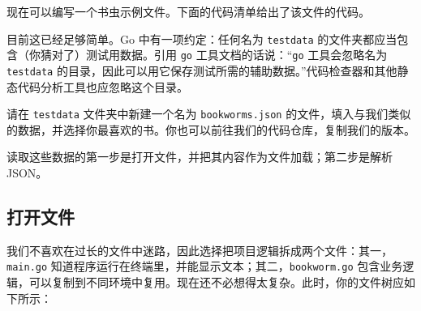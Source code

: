 现在可以编写一个书虫示例文件。下面的代码清单给出了该文件的代码。

\begin{gocode}
\end{gocode}

目前这已经足够简单。Go 中有一项约定：任何名为 \texttt{testdata} 的文件夹都应当包含（你猜对了）测试用数据。引用 \texttt{go} 工具文档的话说：“\texttt{go} 工具会忽略名为 \texttt{testdata} 的目录，因此可以用它保存测试所需的辅助数据。”代码检查器和其他静态代码分析工具也应忽略这个目录。

请在 \texttt{testdata} 文件夹中新建一个名为 \texttt{bookworms.json} 的文件，填入与我们类似的数据，并选择你最喜欢的书。你也可以前往我们的代码仓库，复制我们的版本。

读取这些数据的第一步是打开文件，并把其内容作为文件加载；第二步是解析 JSON。

\subsection{打开文件}

我们不喜欢在过长的文件中迷路，因此选择把项目逻辑拆成两个文件：其一，\texttt{main.go} 知道程序运行在终端里，并能显示文本；其二，\texttt{bookworm.go} 包含业务逻辑，可以复制到不同环境中复用。现在还不必想得太复杂。此时，你的文件树应如下所示：

\begin{treebox}
\end{treebox}

